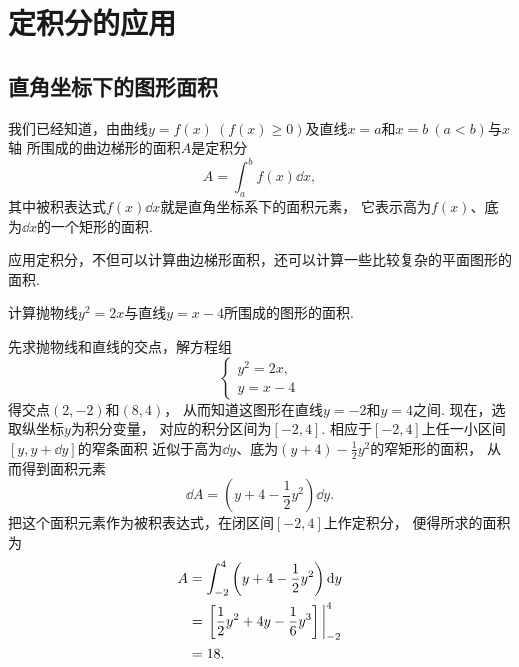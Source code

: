 \section{定积分的应用}
\subsection{直角坐标下的图形面积}
我们已经知道，由曲线\(y=f(x)\ (f(x)\geq0)\)及直线\(x=a\)和\(x=b\ (a<b)\)与\(x\)轴
所围成的曲边梯形的面积\(A\)是定积分\begin{equation*}
	A = \int_a^b f(x) \dd{x},
\end{equation*}
其中被积表达式\(f(x) \dd{x}\)就是直角坐标系下的面积元素，
它表示高为\(f(x)\)、底为\(\dd{x}\)的一个矩形的面积.

应用定积分，不但可以计算曲边梯形面积，还可以计算一些比较复杂的平面图形的面积.

\begin{example}
计算抛物线\(y^2=2x\)与直线\(y=x-4\)所围成的图形的面积.
\begin{solution}
先求抛物线和直线的交点，解方程组\begin{equation*}
	\left\{ \begin{array}{l}
		y^2=2x, \\
		y=x-4
	\end{array} \right.
\end{equation*}得交点\((2,-2)\)和\((8,4)\)，
从而知道这图形在直线\(y=-2\)和\(y=4\)之间.
现在，选取纵坐标\(y\)为积分变量，
对应的积分区间为\([-2,4]\).
相应于\([-2,4]\)上任一小区间\([y,y+\dd{y}]\)的窄条面积
近似于高为\(\dd{y}\)、底为\((y+4)-\frac12y^2\)的窄矩形的面积，
从而得到面积元素\begin{equation*}
	\dd{A} = \left(y+4-\frac12y^2\right) \dd{y}.
\end{equation*}
把这个面积元素作为被积表达式，在闭区间\([-2,4]\)上作定积分，
便得所求的面积为\begin{align*}
	A &= \int_{-2}^4 \left(y+4-\frac12y^2\right) \dd{y} \\
	&= \eval{\left[\frac12y^2+4y-\frac16y^3\right]}_{-2}^4 \\
	&= 18.
\end{align*}
\end{solution}
\end{example}

